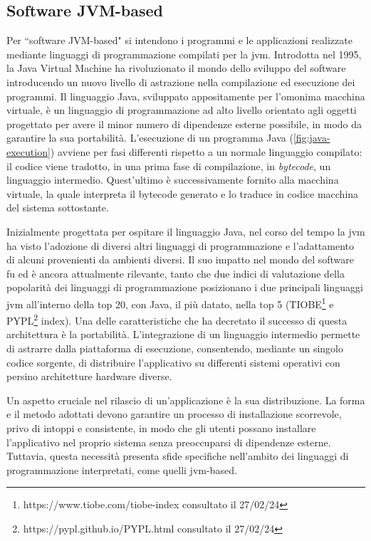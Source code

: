 \subsection{Software JVM-based}
Per ``software JVM-based" si intendono i programmi e le applicazioni realizzate mediante linguaggi di programmazione compilati per la \ac{jvm}. Introdotta nel 1995, la Java Virtual Machine ha rivoluzionato il mondo dello sviluppo del software introducendo un nuovo livello di astrazione nella compilazione ed esecuzione dei programmi. Il linguaggio Java, sviluppato appositamente per l'omonima macchina virtuale, è un linguaggio di programmazione ad alto livello orientato agli oggetti progettato per avere il minor numero di dipendenze esterne possibile, in modo da garantire la sua portabilità. L'esecuzione di un programma Java (\cref{fig:java-execution}) avviene per fasi differenti rispetto a un normale linguaggio compilato: il codice viene tradotto, in una prima fase di compilazione, in \textit{bytecode}, un linguaggio intermedio. Quest'ultimo è successivamente fornito alla macchina virtuale, la quale interpreta il bytecode generato e lo traduce in codice macchina del sistema sottostante.


Inizialmente progettata per ospitare il linguaggio Java, nel corso del tempo la \ac{jvm} ha visto l'adozione di diversi altri linguaggi di programmazione e l'adattamento di alcuni provenienti da ambienti diversi. Il suo impatto nel mondo del software fu ed è ancora attualmente rilevante, tanto che due indici di valutazione della popolarità dei linguaggi di programmazione posizionano i due principali linguaggi \ac{jvm} all'interno della top 20, con Java, il più datato, nella top 5 (TIOBE\footnote{https://www.tiobe.com/tiobe-index consultato il 27/02/24} e PYPL\footnote{https://pypl.github.io/PYPL.html consultato il 27/02/24} index). Una delle caratteristiche che ha decretato il successo di questa architettura è la portabilità. L'integrazione di un linguaggio intermedio permette di astrarre dalla piattaforma di esecuzione, consentendo, mediante un singolo codice sorgente, di distribuire l'applicativo su differenti sistemi operativi con persino architetture hardware diverse.

Un aspetto cruciale nel rilascio di un'applicazione è la sua distribuzione. La forma e il metodo adottati devono garantire un processo di installazione scorrevole, privo di intoppi e consistente, in modo che gli utenti possano installare l'applicativo nel proprio sistema senza preoccuparsi di dipendenze esterne. Tuttavia, questa necessità presenta sfide specifiche nell'ambito dei linguaggi di programmazione interpretati, come quelli \ac{jvm}-based.

